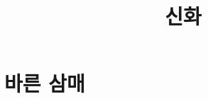 \documentclass[12pt, a3paper, landscape, oneside]{book}
\begin{document}
			\dominitoc
			\doparttoc			




			\title{신화}
			\maketitle


			\tableofcontents 		%
			\cleardoublepage
			\listoftables 			%



	\clearpage	
	\section{바른 삼매}
	\pagestyle{empty}
\end{document}

